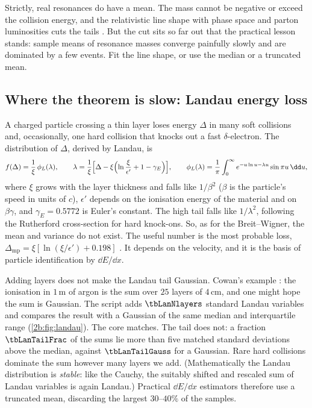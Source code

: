 Strictly, real resonances do have a mean. The mass cannot be negative or exceed the collision energy, and the relativistic line shape with phase space and parton luminosities cuts the tails . But the cut sits so far out that the practical lesson stands: sample means of resonance masses converge painfully slowly and are dominated by a few events. Fit the line shape, or use the median or a truncated mean.

\subsection{Where the theorem is slow: Landau energy loss}
\label{2b:sec:landau}

A charged particle crossing a thin layer loses energy $\Delta$ in many soft collisions and, occasionally, one hard collision that knocks out a fast $\delta$-electron. The distribution of $\Delta$, derived by Landau, is 
\begin{equation}
  f(\Delta)=\frac1\xi\,\phi_L(\lambda),\qquad
  \lambda=\frac1\xi\Bigl[\Delta-\xi\Bigl(\ln\frac{\xi}{\epsilon'}+1-\gamma_E\Bigr)\Bigr],\qquad
  \phi_L(\lambda)=\frac1\pi\int_0^\infty e^{-u\ln u-\lambda u}\sin\pi u\,\dd u ,
  \label{2b:eq:landau}
\end{equation}
where $\xi$ grows with the layer thickness and falls like $1/\beta^2$ ($\beta$ is the particle's speed in units of $c$), $\epsilon'$ depends on the ionisation energy of the material and on $\beta\gamma$, and $\gamma_E=0.5772$ is Euler's constant. The high tail falls like $1/\lambda^2$, following the Rutherford cross-section for hard knock-ons. So, as for the Breit--Wigner, the mean and variance do not exist. The useful number is the most probable loss, $\Delta_{\mathrm{mp}}=\xi[\ln(\xi/\epsilon')+0.198]$ . It depends on the velocity, and it is the basis of particle identification by $\dd E/\dd x$.

Adding layers does not make the Landau tail Gaussian. Cowan's example : the ionisation in $1$\,m of argon is the sum over $25$ layers of $4$\,cm, and one might hope the sum is Gaussian. The script adds $\tbLanNlayers$ standard Landau variables and compares the result with a Gaussian of the same median and interquartile range (\cref{2b:fig:landau}). The core matches. The tail does not: a fraction $\tbLanTailFrac$ of the sums lie more than five matched standard deviations above the median, against $\tbLanTailGauss$ for a Gaussian. Rare hard collisions dominate the sum however many layers we add. (Mathematically the Landau distribution is \emph{stable}: like the Cauchy, the suitably shifted and rescaled sum of Landau variables is again Landau.) Practical $\dd E/\dd x$ estimators therefore use a truncated mean, discarding the largest $30$--$40\%$ of the samples.

